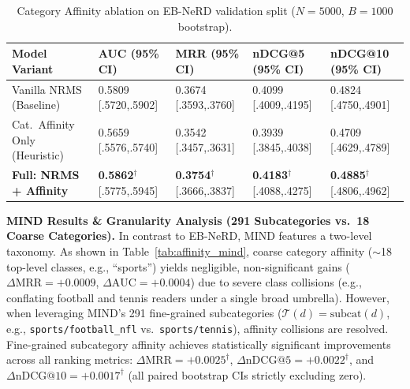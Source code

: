 \documentclass[11pt,a4paper]{article}
\begin{document}
\begin{table}[h!]
  \centering
  \caption{Category Affinity ablation on EB-NeRD validation split ($N{=}5000$, $B{=}1000$ bootstrap).}
  \label{tab:affinity_ebnerd}
  \vspace{-2pt}
  \small\setlength{\tabcolsep}{3pt}
  \begin{tabularx}{\linewidth}{l X X X X}
    \toprule
    \textbf{Model Variant} & \textbf{AUC (95\% CI)} & \textbf{MRR (95\% CI)} & \textbf{nDCG@5 (95\% CI)} & \textbf{nDCG@10 (95\% CI)} \\
    \midrule
    Vanilla NRMS (Baseline)         & 0.5809 [.5720,.5902] & 0.3674 [.3593,.3760] & 0.4099 [.4009,.4195] & 0.4824 [.4750,.4901] \\
    Cat.\ Affinity Only (Heuristic) & 0.5659 [.5576,.5740] & 0.3542 [.3457,.3631] & 0.3939 [.3845,.4038] & 0.4709 [.4629,.4789] \\
    \textbf{Full: NRMS + Affinity}  & \textbf{0.5862}$^\dagger$ [.5775,.5945] & \textbf{0.3754}$^\dagger$ [.3666,.3837] & \textbf{0.4183}$^\dagger$ [.4088,.4275] & \textbf{0.4885}$^\dagger$ [.4806,.4962] \\
    \bottomrule
  \end{tabularx}
\end{table}

\textbf{MIND Results \& Granularity Analysis (291 Subcategories vs.\ 18 Coarse Categories).} In contrast to EB-NeRD, MIND features a two-level taxonomy. As shown in Table~\ref{tab:affinity_mind}, coarse category affinity ($\sim$18 top-level classes, e.g., ``sports'') yields negligible, non-significant gains ($\Delta\text{MRR} = +0.0009$, $\Delta\text{AUC} = +0.0004$) due to severe class collisions (e.g., conflating football and tennis readers under a single broad umbrella). However, when leveraging MIND's 291 fine-grained subcategories ($\mathcal{T}(d) = \text{subcat}(d)$, e.g., \texttt{sports/football\_nfl} vs.\ \texttt{sports/tennis}), affinity collisions are resolved. Fine-grained subcategory affinity achieves statistically significant improvements across all ranking metrics: $\Delta\text{MRR} = +0.0025^\dagger$, $\Delta\text{nDCG@5} = +0.0022^\dagger$, and $\Delta\text{nDCG@10} = +0.0017^\dagger$ (all paired bootstrap CIs strictly excluding zero).
\end{document}
